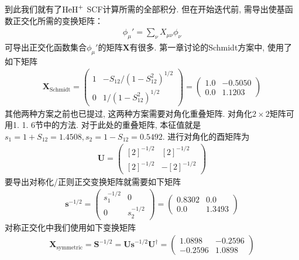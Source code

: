 到此我们就有了$\mathrm{HeH}^+$ SCF计算所需的全部积分. 
但在开始迭代前, 
需导出使基函数正交化所需的变换矩阵：
\begin{align}
	\phi_\mu'=\sum_\nu X_{\mu\nu}\phi_\nu
\end{align}
可导出正交化函数集合$\phi_\mu'$的矩阵$\mathbf{X}$有很多. 
第一章讨论的Schmidt方案中, 
使用了如下矩阵
\begin{align}
	\mathbf{X}_\mathrm{Schmidt} = 
	\begin{pmatrix}
		1 & -S_{12}/(1-S_{12}^2)^{1/2} \\
		0 & 1/(1-S_{12}^2)^{1/2}
	\end{pmatrix}=
	\begin{pmatrix}
		1.0 & -0.5050 \\
		0.0 & 1.1203
	\end{pmatrix}
\end{align}
其他两种方案之前也已提过, 
这两种方案需要对角化重叠矩阵. 
对角化$2\times2$矩阵可用1.
1.
6节中的方法. 
对于此处的重叠矩阵, 
本征值就是$s_1=1+S_{12}=1.4508,s_2=1-S_{12}=0.5492$. 
进行对角化的酉矩阵为
\begin{align}
	\mathbf{U}=
	\begin{pmatrix}
		[2]^{-1/2}&[2]^{-1/2}\\
		[2]^{-1/2}&-[2]^{-1/2}
	\end{pmatrix}
\end{align}
要导出对称化/正则正交变换矩阵就需要如下矩阵
\begin{align}
	\mathbf{s}^{-1/2}=
	\begin{pmatrix}
		s_1^{-1/2}&0\\0&s_2^{-1/2}
	\end{pmatrix}=
	\begin{pmatrix}
		0.8302&0.0\\0.0&1.3493
	\end{pmatrix}
\end{align}
对称正交化中我们使用如下变换矩阵
\begin{align}
	\mathbf{X}_\mathrm{symmetric} = \mathbf{S}^{-1/2}=\mathbf{Us}^{-1/2}\mathbf{U^\dagger}=
	\begin{pmatrix}
		1.0898&-0.2596\\-0.2596&1.0898
	\end{pmatrix}
\end{align}
